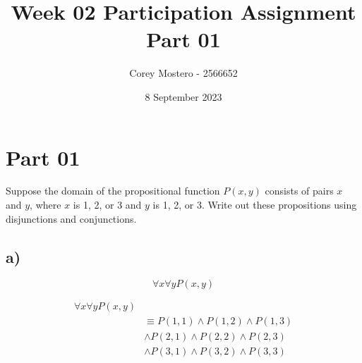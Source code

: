 \documentclass{article}
\title{Week 02 Participation Assignment Part 01}
\author{Corey Mostero - 2566652}
\date{8 September 2023}
\begin{document}
\newcommand{\hr}{\par\noindent\rule{\textwidth}{0.4pt}}

\newcommand{\bc}[1]{
	\begin{equation*}
		\begin{boxed}
			{#1}
		\end{boxed}
	\end{equation*}
}

\newcommand{\cond}[2]{
	\ifmmode
	{#1} \quad {#2}
	\else
	$$ {#1} \quad {#2} $$
	\fi
}

\newcommand{\matr}[1]{
	\ifmmode \bm{#1}
	\else \textit{\textbf{#1}}
	\fi
}
\newcommand{\vect}[1]{
	\ifmmode \mathbf{#1}
	\else \textbf{#1}
	\fi
}


\maketitle
\newpage

\tableofcontents

\section{Part 01}

Suppose the domain of the propositional function $ P(x, y) $ consists of pairs $ x $ and $ y $, where $ x $ is 1, 2, or 3 and $ y $ is 1, 2, or 3. Write out these propositions using disjunctions and conjunctions.

\subsection{a)}
\begin{equation*}
	\forall x \forall y P(x, y)
\end{equation*}

\begin{align*}
	\forall x \forall y P(x, y) &                                            \\
	                            & \equiv P(1, 1) \land P(1, 2) \land P(1, 3) \\
	                            & \land P(2, 1) \land P(2, 2) \land P(2, 3)  \\
	                            & \land P(3, 1) \land P(3, 2) \land P(3, 3)
\end{align*}
\end{document}
